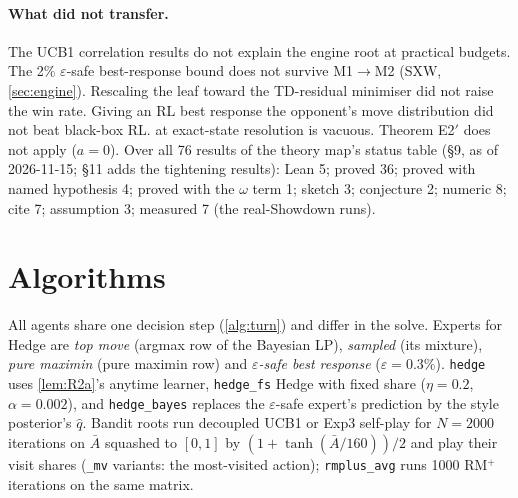 \documentclass[10pt]{article}
\theoremstyle{plain}
\theoremstyle{definition}
\theoremstyle{remark}
\newcommand{\qhat}{\hat q}
\begin{document}
\paragraph{What did not transfer.} The UCB1 correlation results do not explain the engine root at practical budgets.
The 2\% $\varepsilon$-safe best-response bound does not survive M1$\to$M2 (SXW, \cref{sec:engine}). Rescaling the leaf toward the
TD-residual minimiser did not raise the win rate. Giving an RL best response the opponent's move distribution did not
beat black-box RL.  at exact-state resolution is vacuous. Theorem E2$'$ does not apply ($a=0$). Over all 76
results of the theory map's status table (\S9, as of 2026-11-15; \S11 adds the tightening results): Lean 5; proved 36; proved with named hypothesis 4; proved with the $\omega$ term 1; sketch 3;
conjecture 2; numeric 8; cite 7; assumption 3; measured 7 (the real-Showdown runs).

\section{Algorithms}\label{sec:alg}

All agents share one decision step (\cref{alg:turn}) and differ in the solve. Experts for Hedge are \emph{top move} (argmax
row of the Bayesian LP), \emph{sampled} (its mixture), \emph{pure maximin} (pure maximin row) and \emph{$\varepsilon$-safe best response}
($\varepsilon=0.3\%$). \texttt{hedge} uses \cref{lem:R2a}'s anytime learner, \texttt{hedge\_fs} Hedge with fixed share
($\eta=0.2$, $\alpha=0.002$), and \texttt{hedge\_bayes} replaces the $\varepsilon$-safe expert's prediction by the style posterior's $\qhat$.
Bandit roots run decoupled UCB1 or Exp3 self-play for $N=2000$ iterations on $\bar A$ squashed to $[0,1]$ by
$(1+\tanh(\bar A/160))/2$ and play their visit shares (\texttt{\_mv} variants: the most-visited action); \texttt{rmplus\_avg}
runs 1000 RM$^+$ iterations on the same matrix.
\end{document}
